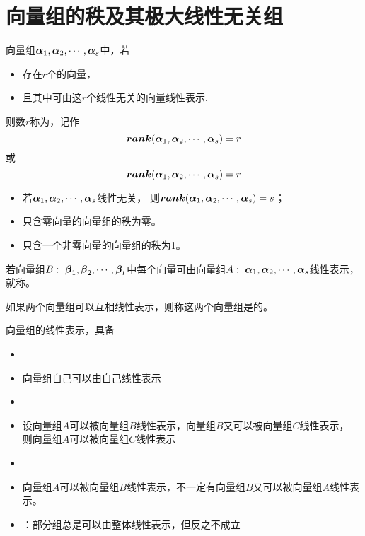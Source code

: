 \section{向量组的秩及其极大线性无关组}

\begin{frame}
\begin{dingyi}[向量组的秩]
  向量组$\boldsymbol{\alpha}_1,\boldsymbol{\alpha}_2,\cdots,\boldsymbol{\alpha}_s$中，若
  \begin{itemize}
  \item 存在$r$个的向量，
  \item 且其中可由这$r$个线性无关的向量线性表示, 
  \end{itemize}
  则数$r$称为，记作
  $$
  \boldsymbol{rank}(\boldsymbol{\alpha}_1,\boldsymbol{\alpha}_2,\cdots,\boldsymbol{\alpha}_s)=r
  $$
  或
  $$
  \boldsymbol{rank}(\boldsymbol{\alpha}_1,\boldsymbol{\alpha}_2,\cdots,\boldsymbol{\alpha}_s)=r
  $$
\end{dingyi}

\end{frame}

\begin{frame}
\begin{itemize}
\item 若$\boldsymbol{\alpha}_1,\boldsymbol{\alpha}_2,\cdots,\boldsymbol{\alpha}_s$线性无关，
  则$\boldsymbol{rank}(\boldsymbol{\alpha}_1,\boldsymbol{\alpha}_2,\cdots,\boldsymbol{\alpha}_s)=s$；
\item 只含零向量的向量组的秩为零。
\item 只含一个非零向量的向量组的秩为1。
\end{itemize}
\end{frame}

\begin{frame}
\begin{dingyi}
  若向量组$B:~\boldsymbol{\beta}_1,\boldsymbol{\beta}_2,\cdots,\boldsymbol{\beta}_t$中每个向量可由向量组$A:~\boldsymbol{\alpha}_1,\boldsymbol{\alpha}_2,\cdots,\boldsymbol{\alpha}_s$线性表示，
  就称。 
  \vspace{0.1in}
  
  如果两个向量组可以互相线性表示，则称这两个向量组是的。
\end{dingyi}
\end{frame}

\begin{frame}
向量组的线性表示，具备
\begin{itemize}
\item {}
\item[]向量组自己可以由自己线性表示  
\item {}
\item[] 设向量组$A$可以被向量组$B$线性表示，向量组$B$又可以被向量组$C$线性表示，
  则向量组$A$可以被向量组$C$线性表示  
\item {}
\item[] 向量组$A$可以被向量组$B$线性表示，不一定有向量组$B$又可以被向量组$A$线性表示。  
\item[] ：部分组总是可以由整体线性表示，但反之不成立
\end{itemize} 
\end{frame}

